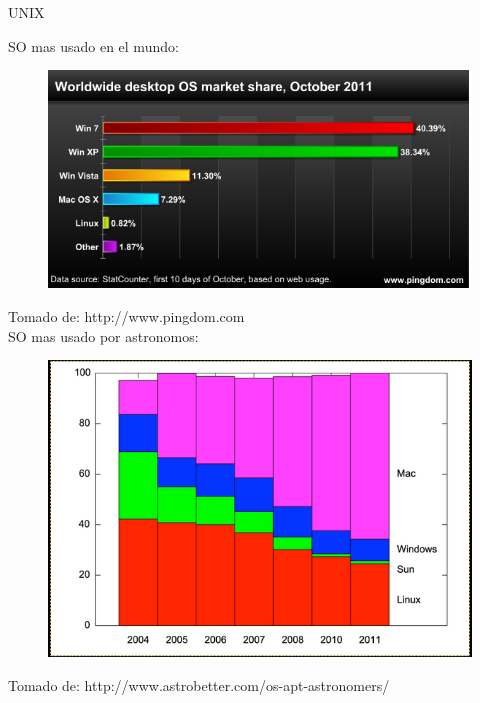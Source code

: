 \documentclass{beamer}
\begin{document}
\begin{frame}{\textrm{UNIX}}

\textrm{SO mas usado en el mundo:}
\begin{figure}
\includegraphics[scale=0.25]{fig2.png}
\end{figure}
{\scriptsize \textrm{Tomado de: http://www.pingdom.com}}\\
\textrm{SO mas usado por astronomos:}
\begin{figure}
\includegraphics[scale=0.2]{fig1.png}
\end{figure}
{\scriptsize \textrm{Tomado de: http://www.astrobetter.com/os-apt-astronomers/}}\\


\end{frame}

\end{document}
